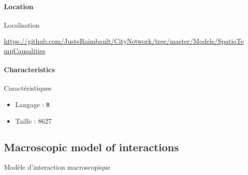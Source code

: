 
\paragraph{Location}{Localisation}

\url{https://github.com/JusteRaimbault/CityNetwork/tree/master/Models/SpatioTempCausalities}

\paragraph{Characteristics}{Caractéristiques}

\begin{itemize}
\item Langage : \texttt{R}
\item Taille : 8627
\end{itemize}











\subsection{Macroscopic model of interactions}{Modèle d'interaction macroscopique}

